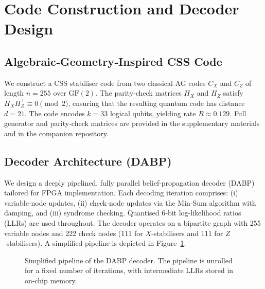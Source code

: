 \documentclass[conference]{IEEEtran}
\begin{document}
\section{Code Construction and Decoder Design}

\subsection{Algebraic‑Geometry‑Inspired CSS Code}
We construct a CSS stabiliser code from two classical AG codes $C_X$ and $C_Z$ of length $n=255$ over $\mathrm{GF}(2)$.  The parity‑check matrices $H_X$ and $H_Z$ satisfy $H_X H_Z^\top \equiv 0 \pmod{2}$, ensuring that the resulting quantum code has distance $d=21$.  The code encodes $k=33$ logical qubits, yielding rate $R\approx 0.129$.  Full generator and parity‑check matrices are provided in the supplementary materials and in the companion repository.

\subsection{Decoder Architecture (DABP)}

We design a deeply pipelined, fully parallel belief‑propagation decoder (DABP) tailored for FPGA implementation.  Each decoding iteration comprises: (i) variable‑node updates, (ii) check‑node updates via the Min‑Sum algorithm with damping, and (iii) syndrome checking.  Quantised 6‑bit log‑likelihood ratios (LLRs) are used throughout.  The decoder operates on a bipartite graph with 255 variable nodes and 222 check nodes (111 for $X$‑stabilisers and 111 for $Z$‑stabilisers).  A simplified pipeline is depicted in Figure \ref{fig:dabp}.

\begin{figure}[t]
  \centering
  \caption{Simplified pipeline of the DABP decoder.  The pipeline is unrolled for a fixed number of iterations, with intermediate LLRs stored in on‑chip memory.}
  \label{fig:dabp}
\end{figure}
\end{document}
